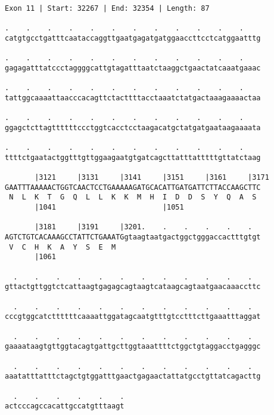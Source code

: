 \documentclass{article}
\begin{document}
\begin{Verbatim}
Exon 11 | Start: 32267 | End: 32354 | Length: 87
 
.    .    .    .    .    .    .    .    .    .    .    .    
catgtgcctgatttcaataccaggttgaatgagatgatggaaccttcctcatggaatttg
  
.    .    .    .    .    .    .    .    .    .    .    .    
gagagatttatccctaggggcattgtagatttaatctaaggctgaactatcaaatgaaac
  
.    .    .    .    .    .    .    .    .    .    .    .    
tattggcaaaattaacccacagttctacttttacctaaatctatgactaaagaaaactaa
  
.    .    .    .    .    .    .    .    .    .    .    .    
ggagctcttagttttttccctggtcacctcctaagacatgctatgatgaataagaaaata
  
.    .    .    .    .    .    .    .    .    .    .    .    
ttttctgaatactggtttgttggaagaatgtgatcagcttatttatttttgttatctaag
  
       |3121     |3131     |3141     |3151     |3161     |3171
GAATTTAAAAACTGGTCAACTCCTGAAAAAGATGCACATTGATGATTCTTACCAAGCTTC
 N  L  K  T  G  Q  L  L  K  K  M  H  I  D  D  S  Y  Q  A  S 
       |1041                         |1051                  
  
       |3181     |3191     |3201.    .    .    .    .    .  
AGTCTGTCACAAAGCCTATTCTGAAATGgtaagtaatgactggctgggaccactttgtgt
 V  C  H  K  A  Y  S  E  M                                  
       |1061                                                
  
  .    .    .    .    .    .    .    .    .    .    .    .  
gttactgttggtctcattaagtgagagcagtaagtcataagcagtaatgaacaaaccttc
  
  .    .    .    .    .    .    .    .    .    .    .    .  
cccgtggcatcttttttcaaaattggatagcaatgtttgtcctttcttgaaatttaggat
  
  .    .    .    .    .    .    .    .    .    .    .    .  
gaaaataagtgttggtacagtgattgcttggtaaattttctggctgtaggacctgagggc
  
  .    .    .    .    .    .    .    .    .    .    .    .  
aaatatttatttctagctgtggatttgaactgagaactattatgcctgttatcagacttg
  
  .    .    .    .    .    .
actcccagccacattgccatgtttaagt
\end{Verbatim}
\newpage
\end{document}

